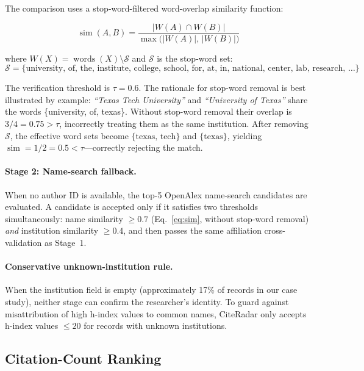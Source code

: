 \documentclass[11pt]{article}
\begin{document}
The comparison uses a stop-word-filtered word-overlap similarity function:

\begin{equation}
\operatorname{sim}(A, B)
  = \frac{\bigl|W(A) \cap W(B)\bigr|}{\max\!\bigl(|W(A)|,\,|W(B)|\bigr)}
\label{eq:sim}
\end{equation}

where $W(X) = \operatorname{words}(X) \setminus \mathcal{S}$ and
$\mathcal{S}$ is the stop-word set:
\begin{equation}
\mathcal{S} = \bigl\{
  \text{university, of, the, institute, college, school,}
  \text{ for, at, in, national, center, lab, research, \ldots}
\bigr\}
\label{eq:stopwords}
\end{equation}

The verification threshold is $\tau = 0.6$.
The rationale for stop-word removal is best illustrated by example:
\textit{``Texas Tech University''} and \textit{``University of Texas''}
share the words \{university, of, texas\}.
Without stop-word removal their overlap is $3/4 = 0.75 > \tau$, incorrectly
treating them as the same institution.
After removing $\mathcal{S}$, the effective word sets become
$\{\text{texas, tech}\}$ and $\{\text{texas}\}$, yielding
$\operatorname{sim} = 1/2 = 0.5 < \tau$—correctly rejecting the match.

\paragraph{Stage 2: Name-search fallback.}
When no author ID is available, the top-5 OpenAlex name-search candidates
are evaluated.
A candidate is accepted only if it satisfies two thresholds simultaneously:
name similarity $\geq 0.7$ (Eq.~\ref{eq:sim}, without stop-word removal)
\emph{and} institution similarity $\geq 0.4$,
and then passes the same affiliation cross-validation as Stage~1.

\paragraph{Conservative unknown-institution rule.}
When the institution field is empty (approximately 17\% of records in our
case study), neither stage can confirm the researcher's identity.
To guard against misattribution of high h-index values to common names,
CiteRadar only accepts h-index values $\leq 20$ for records with unknown
institutions.

\subsection{Citation-Count Ranking}
\end{document}
